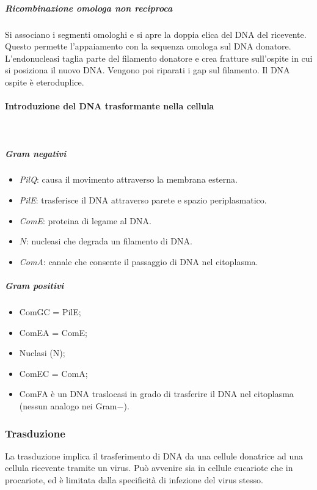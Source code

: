 				\subparagraph{Ricombinazione omologa non reciproca}
				Si associano i segmenti omologhi e si apre la doppia elica del DNA del ricevente.
				Questo permette l'appaiamento con la sequenza omologa sul DNA donatore.
				L'endonucleasi taglia parte del filamento donatore e crea fratture sull'ospite in cui si posiziona il nuovo DNA.
				Vengono poi riparati i gap sul filamento.
				Il DNA ospite \`e eteroduplice.

			\paragraph{Introduzione del DNA trasformante nella cellula}\mbox{}\\
			\begin{multicols}{2}
				
				\subparagraph{Gram negativi}
				\begin{itemize}
					\item \emph{PilQ}: causa il movimento attraverso la membrana esterna.
					\item \emph{PilE}: trasferisce il DNA attraverso parete e spazio periplasmatico.
					\item \emph{ComE}: proteina di legame al DNA.
					\item $N$: nucleasi che degrada un filamento di DNA.
					\item \emph{ComA}: canale che consente il passaggio di DNA nel citoplasma.
				\end{itemize}
				\columnbreak
				
				\subparagraph{Gram positivi}
    				\begin{itemize}
        				\item ComGC = PilE;
        				\item ComEA = ComE;
        				\item Nuclasi (N);
        				\item ComEC = ComA;
        				\item ComFA è un DNA traslocasi in grado di trasferire il DNA nel citoplasma (nessun analogo nei Gram$-$).
				\end{itemize}
			\end{multicols}
		
		\subsubsection{Trasduzione}
		La trasduzione implica il trasferimento di DNA da una cellule donatrice ad una cellula ricevente tramite un virus. 
		Può avvenire sia in cellule eucariote che in procariote, ed è limitata dalla specificità di infezione del virus stesso. 

